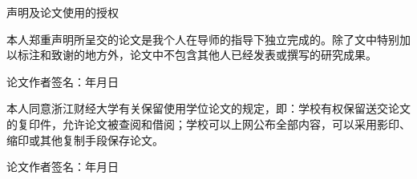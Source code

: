 
\newcommand{\authorsignature}{
	\begin{flushright}
		论文作者签名：\hspace{75mm}年\hspace{8mm}月\hspace{8mm}日
	\end{flushright}
}
\pagestyle{original}
\setlength{\parskip}{0.4em}
\renewcommand{\baselinestretch}{1.41}

\vspace*{-6mm}

\begin{center}
	\heiti{}\textmd{声明及论文使用的授权}
\end{center}

\vspace{10mm}



本人郑重声明所呈交的论文是我个人在导师的指导下独立完成的。除了文中特别加以标注和致谢的地方外，论文中不包含其他人已经发表或撰写的研究成果。

\vspace{15mm}

\authorsignature

\vspace{40mm}



本人同意浙江财经大学有关保留使用学位论文的规定，即：学校有权保留送交论文的复印件，允许论文被查阅和借阅；学校可以上网公布全部内容，可以采用影印、缩印或其他复制手段保存论文。

\vspace*{15mm}

\authorsignature

\newpage
